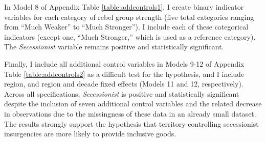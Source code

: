 \documentclass[12pt, letterpaper]{article}
\begin{document}
In Model 8 of Appendix Table \ref{table:addcontrols1}, I create binary indicator variables for each category of rebel group strength (five total categories ranging from ``Much Weaker'' to ``Much Stronger''). I include each of these categorical indicators (except one, ``Much Stronger,'' which is used as a reference category). The \textit{Secessionist} variable remains positive and statistically significant.

Finally, I include all additional control variables in Models 9-12 of Appendix Table \ref{table:addcontrols2} as a difficult test for the hypothesis, and I include region, and region and decade fixed effects (Models 11 and 12, respectively). Across all specifications, \textit{Secessionist} is positive and statistically significant despite the inclusion of seven additional control variables and the related decrease in observations due to the missingness of these data in an already small dataset. The results strongly support the hypothesis that territory-controlling secessionist insurgencies are more likely to provide inclusive goods. 


\end{document}

